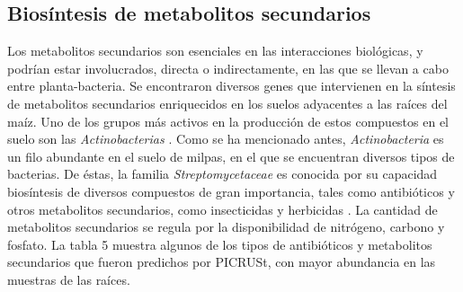 \documentclass[12pt,letterpaper,oneside]{report}
\begin{document}
\subsection{Biosíntesis de metabolitos secundarios}
Los metabolitos secundarios son esenciales en las interacciones biológicas, y podrían estar involucrados, directa o indirectamente, en las que se llevan a cabo entre planta-bacteria. Se encontraron diversos genes que intervienen en la síntesis de metabolitos secundarios enriquecidos en los suelos adyacentes a las raíces del maíz. Uno de los grupos más activos en la producción de estos compuestos en el suelo son las \textit{Actinobacterias} \autocite{Barka2015}. Como se ha mencionado antes, \textit{Actinobacteria} es un filo abundante en el suelo de milpas, en el que se encuentran diversos tipos de bacterias. De éstas, la familia \textit{Streptomycetaceae} es conocida por su capacidad biosíntesis de diversos compuestos de gran importancia, tales como antibióticos y otros metabolitos secundarios, como insecticidas y herbicidas \autocite{Barka2015}. La cantidad de metabolitos secundarios se regula por la disponibilidad de nitrógeno, carbono y fosfato. La tabla 5 muestra algunos de los tipos de antibióticos y metabolitos secundarios que fueron predichos por PICRUSt, con mayor abundancia en las muestras de las raíces.
\end{document}
